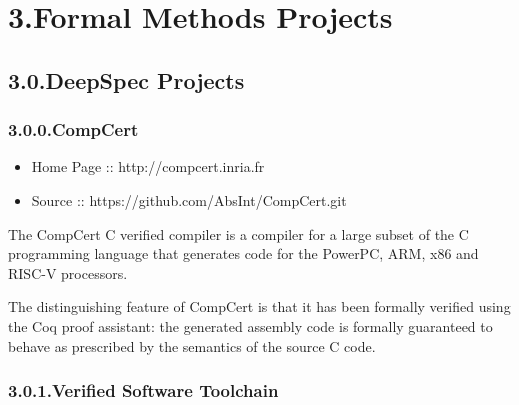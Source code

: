 \documentclass[12pt,twoside]{article}
\begin{document}
\section{3.\hspace*{0.5em}Formal Methods Projects}\label{sec-formal-methods-projects}%

\subsection{3.0.\hspace*{0.5em}DeepSpec Projects}\label{sec-deepspec-projects}%

\subsubsection{3.0.0.\hspace*{0.5em}CompCert}\label{sec-compcert}%

\begin{itemize}[noitemsep,topsep=\mdcompacttopsep]%

\item{}Home Page :: http://compcert.inria.fr%

\item{}Source :: https://github.com/AbsInt/CompCert.git%
\end{itemize}%

\noindent{}The CompCert C verified compiler is a compiler for a large subset of
the C programming language that generates code for the PowerPC, ARM,
x86 and RISC-V processors.%

The distinguishing feature of CompCert is that it has been formally
verified using the Coq proof assistant: the generated assembly code is
formally guaranteed to behave as prescribed by the semantics of the
source C code.%

\subsubsection{3.0.1.\hspace*{0.5em}Verified Software Toolchain}\label{sec-verified-software-toolchain}%
\end{document}
